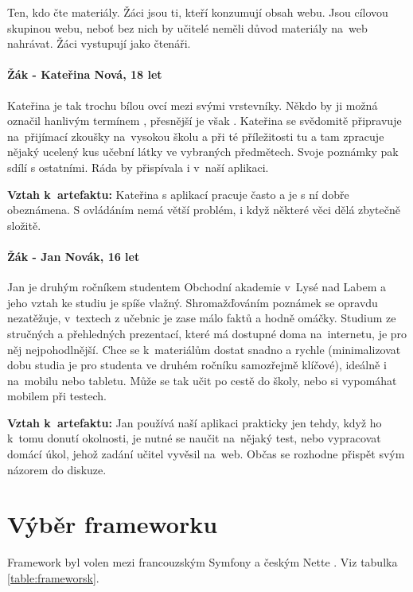 \documentclass[thesis=B,czech]{FITthesis}[2012/06/26]
\begin{document}
Ten, kdo čte materiály. Žáci jsou ti, kteří konzumují obsah webu. Jsou cílovou skupinou webu, neboť bez nich by učitelé neměli důvod materiály na~web nahrávat. Žáci vystupují jako čtenáři.

\paragraph{Žák - Kateřina Nová, 18 let}
Kateřina je tak trochu bílou ovcí mezi svými vrstevníky. Někdo by ji možná označil hanlivým termínem , přesnější je však . Kateřina se svědomitě připravuje na~přijímací zkoušky na~vysokou školu a při té příležitosti tu a tam zpracuje nějaký ucelený kus učební látky ve vybraných předmětech. Svoje poznámky pak sdílí s ostatními. Ráda by přispívala i v~naší aplikaci.

\textbf{Vztah k~artefaktu:} Kateřina s aplikací pracuje často a je s ní dobře obeznámena. S ovládáním nemá větší problém, i když některé věci dělá zbytečně složitě.

\paragraph{Žák - Jan Novák, 16 let}
Jan je druhým ročníkem studentem Obchodní akademie v~Lysé nad Labem a jeho vztah ke studiu je spíše vlažný. Shromažďováním poznámek se opravdu nezatěžuje, v~textech z učebnic je zase málo faktů a hodně omáčky. Studium ze stručných a přehledných prezentací, které má dostupné doma na~internetu, je pro něj nejpohodlnější. Chce se k~materiálům dostat snadno a rychle (minimalizovat dobu studia je pro studenta ve druhém ročníku samozřejmě klíčové), ideálně i na~mobilu nebo tabletu. Může se tak učit po cestě do školy, nebo si vypomáhat mobilem při testech.

\textbf{Vztah k~artefaktu: }Jan používá naší aplikaci prakticky jen tehdy, když ho k~tomu donutí okolnosti, je nutné se naučit na~nějaký test, nebo vypracovat domácí úkol, jehož zadání učitel vyvěsil na~web. Občas se rozhodne přispět svým názorem do diskuze.



\section{Výběr frameworku}

Framework byl volen mezi francouzským Symfony a českým Nette \cite{pnovotny}. Viz tabulka  \ref{table:frameworsk}.
\end{document}
